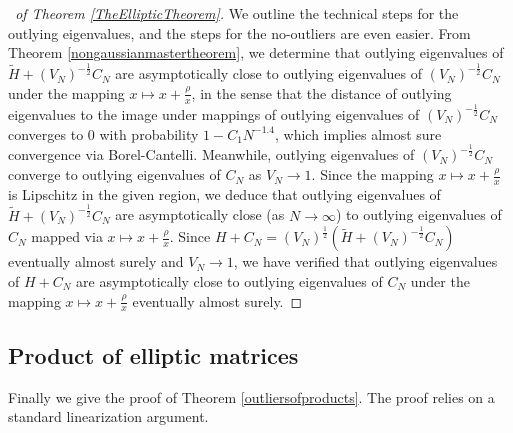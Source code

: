 \documentclass[11pt,reqno]{amsart}
\theoremstyle{plain}
\theoremstyle{remark}
\numberwithin{equation}{section}
\begin{document}
\begin{proof}[\proofname\ of Theorem \ref{TheEllipticTheorem}]
   We outline the technical steps for the outlying eigenvalues, and the steps for the no-outliers are even easier.
   From Theorem \ref{nongaussianmastertheorem}, we determine that outlying eigenvalues of $\widetilde{H}+(V_N)^{-\frac{1}{2}}C_N$ are asymptotically close to outlying eigenvalues of $(V_N)^{-\frac{1}{2}}C_N$ under the mapping $x\mapsto x+\frac{\rho}{x}$, in the sense that the distance of outlying eigenvalues to the image under mappings of outlying eigenvalues of $(V_N)^{-\frac{1}{2}}C_N$ converges to 0 with probability $1-C_1N^{-1.4}$, which implies almost sure convergence via Borel-Cantelli. Meanwhile, outlying eigenvalues of $(V_N)^{-\frac{1}{2}}C_N$ converge to outlying eigenvalues of $C_N$ as $V_N\to 1$. Since the mapping $x\mapsto x+\frac{\rho}{x}$ is Lipschitz in the given region, we deduce that outlying eigenvalues of $\widetilde{H}+(V_N)^{-\frac{1}{2}}C_N$ are asymptotically close (as $N\to\infty$) to outlying eigenvalues of $C_N$ mapped via $x\mapsto x+\frac{\rho}{x}$. Since $H+C_N=(V_N)^{\frac{1}{2}}(\widetilde{H}+(V_N)^{-\frac{1}{2}}C_N)$ eventually almost surely and $V_N\to 1$, we have verified that outlying eigenvalues of $H+C_N$ are asymptotically close to outlying eigenvalues of $C_N$ under the mapping $x\mapsto x+\frac{\rho}{x}$ eventually almost surely. 
\end{proof}



\subsection{Product of elliptic matrices}\label{subsection4.2}

Finally we give the proof of Theorem \ref{outliersofproducts}. The proof relies on a standard linearization argument.
\end{document}
